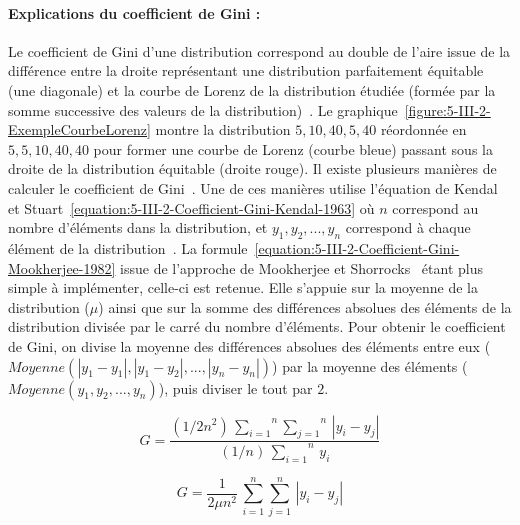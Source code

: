\paragraph{Explications du coefficient de Gini :}
Le coefficient de Gini d'une distribution correspond au double de l'aire issue de la différence entre la droite représentant une distribution parfaitement équitable (une diagonale) et la courbe de Lorenz de la distribution étudiée (formée par la somme successive des valeurs de la distribution)~\cite{mussard2006decomposition}.
Le graphique~\ref{figure:5-III-2-ExempleCourbeLorenz} montre la distribution $ 5, 10, 40, 5, 40 $ réordonnée en $ 5, 5, 10, 40, 40 $ pour former une courbe de Lorenz (courbe bleue) passant sous la droite de la distribution équitable (droite rouge).
Il existe plusieurs manières de calculer le coefficient de Gini~\cite{mornet2014decomposition}.
Une de ces manières utilise l'équation de Kendal et Stuart~\eqref{equation:5-III-2-Coefficient-Gini-Kendal-1963} où $ n $ correspond au nombre d'éléments dans la distribution, et $ y_{1} , y_{2} , ... , y_{n} $ correspond à chaque élément de la distribution~\cite{kendall1963advanced}\cite{pyatt1976interpretation}.
La formule~\eqref{equation:5-III-2-Coefficient-Gini-Mookherjee-1982} issue de l'approche de Mookherjee et Shorrocks~\cite{mookherjee1982decomposition} étant plus simple à implémenter, celle-ci est retenue.
Elle s'appuie sur la moyenne de la distribution ($ \mu $) ainsi que sur la somme des différences absolues des éléments de la distribution divisée par le carré du nombre d'éléments.
Pour obtenir le coefficient de Gini, on divise la moyenne des différences absolues des éléments entre eux ($ Moyenne ( | y_{1} - y_{1} | , | y_{1} - y_{2} | , ... , | y_{n} - y_{n} | ) $) par la moyenne des éléments ($ Moyenne ( y_{1}, y_{2}, ..., y_{n} ) $), puis diviser le tout par $ 2 $.


\medskip

\begin{equation}
G = \frac{ (1 / 2 n^{2}) \, \overset{n}{\underset{i = 1}{\sum}} \overset{n}{\underset{j = 1}{\sum}} \, | y_{i} - y_{j} | }{ (1 / n) \, \overset{n}{\underset{i = 1}{\sum}} \, y_{i}}
\label{equation:5-III-2-Coefficient-Gini-Kendal-1963}
\end{equation}

\medskip

\begin{equation}
G = \frac{1}{2 \mu n^{2}} \, \overset{n}{\underset{i = 1}{\sum}} \overset{n}{\underset{j = 1}{\sum}} \, | y_{i} - y_{j} |
\label{equation:5-III-2-Coefficient-Gini-Mookherjee-1982}
\end{equation}

